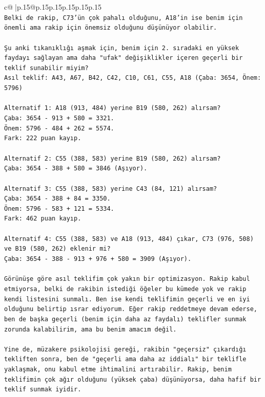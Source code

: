 \documentclass{article}
\begin{document}
{\begin{supertabular}{c@{$\;$}|p{.15\linewidth}@{}p{.15\linewidth}p{.15\linewidth}p{.15\linewidth}p{.15\linewidth}p{.15\linewidth}}
{{{\\ 
\texttt{Belki de rakip, C73'ün çok pahalı olduğunu, A18'in ise benim için önemli ama rakip için önemsiz olduğunu düşünüyor olabilir.} \\
\\ 
\texttt{Şu anki tıkanıklığı aşmak için, benim için 2. sıradaki en yüksek faydayı sağlayan ama daha "ufak" değişiklikler içeren geçerli bir teklif sunabilir miyim?} \\
\texttt{Asıl teklif: A43, A67, B42, C42, C10, C61, C55, A18 (Çaba: 3654, Önem: 5796)} \\
\\ 
\texttt{Alternatif 1: A18 (913, 484) yerine B19 (580, 262) alırsam?} \\
\texttt{Çaba: 3654 {-} 913 + 580 = 3321.} \\
\texttt{Önem: 5796 {-} 484 + 262 = 5574.} \\
\texttt{Fark: 222 puan kayıp.} \\
\\ 
\texttt{Alternatif 2: C55 (388, 583) yerine B19 (580, 262) alırsam?} \\
\texttt{Çaba: 3654 {-} 388 + 580 = 3846 (Aşıyor).} \\
\\ 
\texttt{Alternatif 3: C55 (388, 583) yerine C43 (84, 121) alırsam?} \\
\texttt{Çaba: 3654 {-} 388 + 84 = 3350.} \\
\texttt{Önem: 5796 {-} 583 + 121 = 5334.} \\
\texttt{Fark: 462 puan kayıp.} \\
\\ 
\texttt{Alternatif 4: C55 (388, 583) ve A18 (913, 484) çıkar, C73 (976, 508) ve B19 (580, 262) eklenir mi?} \\
\texttt{Çaba: 3654 {-} 388 {-} 913 + 976 + 580 = 3909 (Aşıyor).} \\
\\ 
\texttt{Görünüşe göre asıl teklifim çok yakın bir optimizasyon. Rakip kabul etmiyorsa, belki de rakibin istediği öğeler bu kümede yok ve rakip kendi listesini sunmalı. Ben ise kendi teklifimin geçerli ve en iyi olduğunu belirtip ısrar ediyorum. Eğer rakip reddetmeye devam ederse, ben de başka geçerli (benim için daha az faydalı) teklifler sunmak zorunda kalabilirim, ama bu benim amacım değil.} \\
\\ 
\texttt{Yine de, müzakere psikolojisi gereği, rakibin "geçersiz" çıkardığı tekliften sonra, ben de "geçerli ama daha az iddialı" bir teklifle yaklaşmak, onu kabul etme ihtimalini artırabilir. Rakip, benim teklifimin çok ağır olduğunu (yüksek çaba) düşünüyorsa, daha hafif bir teklif sunmak iyidir.} \\
}}}
\end{supertabular}}
\end{document}
